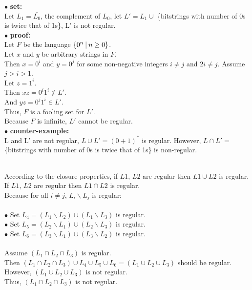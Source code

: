 \documentclass[12pt,a4paper]{article}
\newcommand{\question}[1]{\bigskip\noindent{\textbf{Q{#1} solution}}}
\begin{document}
\noindent
$\bullet$ \textbf{set:}\\
Let $L_1=\overline{L_0}$, the complement of $L_0$, let $L'=L_1 \cup$ \{bitstrings with number of 0s is twice that of 1s\}, L' is not regular.\\
$\bullet$ \textbf{proof:}\\
Let $F$ be the language $\{0^n\ \vline\ n \ge 0\}$. \\
Let $x$ and $y$ be arbitrary strings in $F$. \\
Then $x=0^{i}$ and $y=0^{j}$ for some non-negative integers $i\neq j$ and $2i\neq j$. Assume $j > i >1$. \\
Let $z=1^{i}$. \\
Then $xz=0^{i}1^{i} \notin L'$. \\ 
And $yz = 0^{j}1^{i}\in L'$. \\
Thus, $F$ is a fooling set for $L'$. \\
Because $F$ is infinite, $L'$ cannot be regular. \\

\noindent
$\bullet$ \textbf{counter-example:}\\
L and L' are not regular, $L \cup L' = (0+1)^* $ is regular.
However, $L \cap L' =$ \{bitstrings with number of 0s is twice that of 1s\} is non-regular.


\question{10.C}\\
According to the closure properties, if $L1$, $L2$ are regular then $L1 \cup L2$ is regular. If $L1$, $L2$ are regular then $L1 \cap L2$ is regular.\\
Because for all $i \ne j$, $L_i \backslash L_j$ is regular:\\\\
$\bullet$ Set $L_4 = (L_1 \backslash L_2) \cup (L_1 \backslash L_3)$ is regular.\\
$\bullet$ Set $L_5 = (L_2 \backslash L_1) \cup (L_2 \backslash L_3)$ is regular.\\
$\bullet$ Set $L_6 = (L_3 \backslash L_1) \cup (L_3 \backslash L_2)$ is regular.\\\\
Assume $(L_1 \cap L_2 \cap L_3)$ is regular.\\
Then $(L_1 \cap L_2 \cap L_3) \cup L_4 \cup L_5 \cup L_6= (L_1 \cup L_2 \cup L_3)  $ should be regular. \\
However, $(L_1 \cup L_2 \cup L_3)$ is not regular.\\
Thus, $(L_1 \cap L_2 \cap L_3)$ is not regular.
\end{document}
